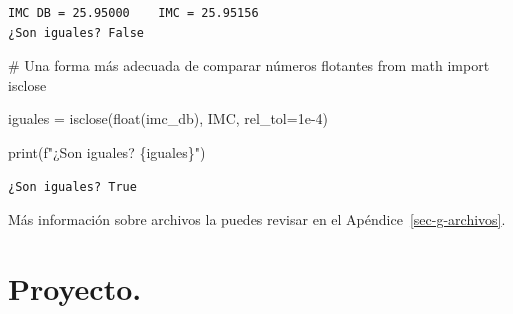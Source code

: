\documentclass[
  spanish,
  letterpaper,
]{scrbook}
\newenvironment{Shaded}{\begin{snugshade}}{\end{snugshade}}
\newcommand{\BuiltInTok}[1]{\textcolor[rgb]{0.00,0.23,0.31}{#1}}
\newcommand{\CommentTok}[1]{\textcolor[rgb]{0.37,0.37,0.37}{#1}}
\newcommand{\FloatTok}[1]{\textcolor[rgb]{0.68,0.00,0.00}{#1}}
\newcommand{\ImportTok}[1]{\textcolor[rgb]{0.00,0.46,0.62}{#1}}
\newcommand{\NormalTok}[1]{\textcolor[rgb]{0.00,0.23,0.31}{#1}}
\newcommand{\OperatorTok}[1]{\textcolor[rgb]{0.37,0.37,0.37}{#1}}
\newcommand{\SpecialCharTok}[1]{\textcolor[rgb]{0.37,0.37,0.37}{#1}}
\newcommand{\SpecialStringTok}[1]{\textcolor[rgb]{0.13,0.47,0.30}{#1}}
\theoremstyle{definition}
\theoremstyle{remark}
\begin{document}
\begin{verbatim}
IMC DB = 25.95000    IMC = 25.95156
¿Son iguales? False
\end{verbatim}

\begin{Shaded}
\begin{Highlighting}[]
\CommentTok{\# Una forma más adecuada de comparar números flotantes}
\ImportTok{from}\NormalTok{ math }\ImportTok{import}\NormalTok{ isclose}

\NormalTok{iguales }\OperatorTok{=}\NormalTok{ isclose(}\BuiltInTok{float}\NormalTok{(imc\_db), IMC, rel\_tol}\OperatorTok{=}\FloatTok{1e{-}4}\NormalTok{)}

\BuiltInTok{print}\NormalTok{(}\SpecialStringTok{f"¿Son iguales? }\SpecialCharTok{\{}\NormalTok{iguales}\SpecialCharTok{\}}\SpecialStringTok{"}\NormalTok{)}
\end{Highlighting}
\end{Shaded}

\begin{verbatim}
¿Son iguales? True
\end{verbatim}

\begin{tcolorbox}[enhanced jigsaw, colframe=quarto-callout-note-color-frame, opacityback=0, toprule=.15mm, colback=white, coltitle=black, leftrule=.75mm, arc=.35mm, breakable, left=2mm, bottomtitle=1mm, rightrule=.15mm, bottomrule=.15mm, colbacktitle=quarto-callout-note-color!10!white, toptitle=1mm, titlerule=0mm, opacitybacktitle=0.6, title=\textcolor{quarto-callout-note-color}{\faInfo}\hspace{0.5em}{Nota.}]

Más información sobre archivos la puedes revisar en el
Apéndice~\ref{sec-g-archivos}.

\end{tcolorbox}

\section{Proyecto.}\label{proyecto.}
\end{document}
